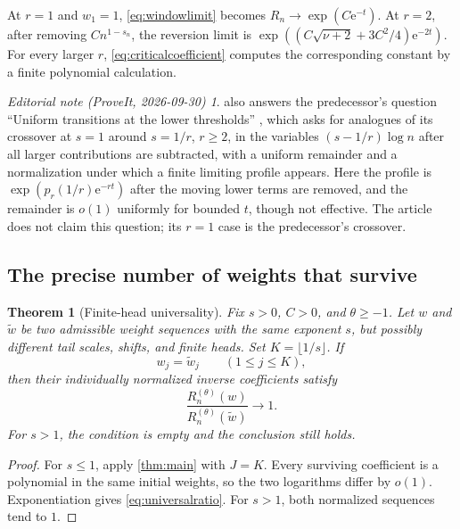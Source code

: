 \documentclass[11pt,a4paper]{article}
\newtheorem{theorem}{Theorem}[section]
\theoremstyle{definition}
\theoremstyle{remark}
\newtheorem*{ednote}{Editorial note (ProveIt, 2026-09-30)}
\newcommand{\ee}{\mathrm e}
\numberwithin{equation}{section}
\begin{document}
At $r=1$ and $w_1=1$, \eqref{eq:windowlimit} becomes
$R_n\to\exp(C\ee^{-t})$. At $r=2$, after removing
$Cn^{1-s_n}$, the reversion limit is
$\exp((C\sqrt{\nu+2}+3C^2/4)\ee^{-2t})$.
For every larger $r$, \eqref{eq:criticalcoefficient} computes the
corresponding constant by a finite polynomial calculation.
\begin{ednote}
 also answers the predecessor's question ``Uniform
transitions at the lower thresholds'' \cite{subexp}, which asks for
analogues of its crossover at $s=1$ around $s=1/r$, $r\ge2$, in the
variables $(s-1/r)\log n$ after all larger contributions are subtracted,
with a uniform remainder and a normalization under which a finite limiting
profile appears. Here the profile is $\exp(p_r(1/r)\ee^{-rt})$ after the
moving lower terms are removed, and the remainder is $o(1)$ uniformly for
bounded $t$, though not effective. The article does not claim this
question; its $r=1$ case is the predecessor's crossover.
\end{ednote}

\subsection{The precise number of weights that survive}
\begin{theorem}[Finite-head universality]\label{thm:universality}
Fix $s>0$, $C>0$, and $\theta\ge-1$. Let $w$ and $\widetilde w$ be
two admissible weight sequences with the same exponent $s$, but
possibly different tail scales, shifts, and finite heads. Set
$K=\lfloor1/s\rfloor$.
If
\begin{equation}
 w_j=\widetilde w_j\qquad(1\le j\le K),
 \label{eq:headagree}
\end{equation}
then their individually normalized inverse coefficients satisfy
\begin{equation}
 \frac{R_n^{(\theta)}(w)}{R_n^{(\theta)}(\widetilde w)}\longrightarrow1.
 \label{eq:universalratio}
\end{equation}
For $s>1$, the condition is empty and the conclusion still holds.
\end{theorem}
\begin{proof}
For $s\le1$, apply \cref{thm:main} with $J=K$. Every surviving
coefficient is a polynomial in the same initial weights, so the two
logarithms differ by $o(1)$. Exponentiation gives
\eqref{eq:universalratio}. For $s>1$, both normalized sequences tend
to $1$.
\end{proof}
\end{document}
